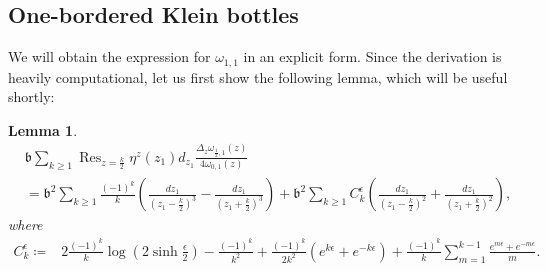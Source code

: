 \documentclass[12pt]{amsart}
\DeclareMathOperator*{\Res}{Res}
\theoremstyle{plain}
\newtheorem{lemma}[theorem]{Lemma}
\theoremstyle{definition}
\theoremstyle{remark}
\numberwithin{equation}{section}
\begin{document}
\subsection{One-bordered Klein bottles}\label{sec:RTR Klein bottle}
We will obtain the expression for $\omega_{1,1}$ in an explicit form. Since the derivation is heavily computational, let us first show the following lemma, which will be useful shortly:

\begin{lemma}\label{lem:w_{1,1}}
    \begin{align}
      &\mathfrak{b}\sum_{k\geq1}\Res_{z=\frac{k}{2}}\eta^z(z_1)d_{z_1}\frac{\Delta_{z}\omega_{\frac12,1}(z)}{4\omega_{0,1}(z)}\nonumber\\
      &=\mathfrak{b}^2\sum_{k\geq1}\frac{(-1)^k}{k}\left(\frac{dz_1}{(z_1-\frac{k}{2})^3}-\frac{dz_1}{(z_1+\frac{k}{2})^3}\right)+\mathfrak{b}^2\sum_{k\geq1}C_k^\epsilon\left(\frac{dz_1}{(z_1-\frac{k}{2})^2}+\frac{dz_1}{(z_1+\frac{k}{2})^2}\right),\nonumber
\end{align}
where
\begin{align}
C^\epsilon_k\coloneqq&2\frac{(-1)^k}{k}\log\left(2\sinh\frac{\epsilon}{2}\right)-\frac{(-1)^k}{k^2}+\frac{(-1)^k}{2k^2}(e^{k\epsilon}+e^{-k\epsilon})+\frac{(-1)^k}{k}\sum_{m=1}^{k-1}\frac{e^{m\epsilon}+e^{-m\epsilon}}{m}.\label{C for 1,1}
\end{align}
\end{lemma}
\end{document}
